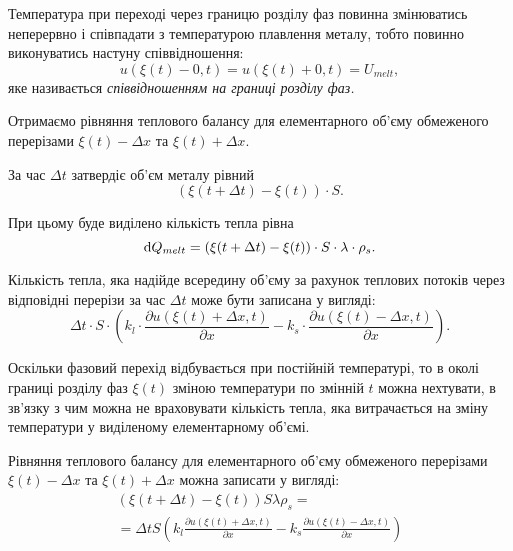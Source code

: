 \begin{definition}
	Температура при переході через границю розділу фаз повинна змінюватись неперервно і співпадати з температурою плавлення металу, тобто повинно виконуватись настуну співвідношення:
	\begin{equation}
		\label{eq:phase-border-conditions}
		u(\xi(t) - 0, t) = u(\xi(t) + 0, t) = U_{melt},
	\end{equation}
	яке називається \it{співвідношенням на границі розділу фаз}.
\end{definition}

Отримаємо рівняння теплового балансу для елементарного об'єму обмеженого перерізами $\xi(t) - \Delta x$ та $\xi(t) + \Delta x$. \medskip

За час $\Delta t$ затвердіє об'єм металу рівний
\begin{equation}
	(\xi(t + \Delta t) - \xi(t)) \cdot S.
\end{equation}

При цьому буде виділено кількість тепла рівна
\begin{equation}
	\mathop{}\!\mathrm{d} Q_{melt} = (\xi(t + \Delta t) - \xi(t)) \cdot S \cdot \lambda \cdot \rho_s.
\end{equation}

Кількість тепла, яка надійде всередину об'єму за рахунок теплових потоків через відповідні перерізи за час $\Delta t$ може бути записана у вигляді:
\begin{equation}
	\Delta t \cdot S \cdot \left( k_l \cdot \frac{\partial u(\xi(t) + \Delta x, t)}{\partial x} - k_s \cdot \frac{\partial u(\xi(t) - \Delta x, t)}{\partial x}\right).
\end{equation}
 
Оскільки фазовий перехід відбувається при постійній температурі, то в околі границі розділу фаз $\xi(t)$ зміною температури по змінній $t$ можна нехтувати, в зв'язку з чим можна не враховувати кількість тепла, яка витрачається на зміну температури у виділеному елементарному об'ємі. \medskip

Рівняння теплового балансу для елементарного об'єму обмеженого перерізами $\xi(t) - \Delta x$ та $\xi(t) + \Delta x$ можна записати у вигляді:
\begin{multline}
	(\xi(t + \Delta t) - \xi(t)) S \lambda \rho_s = \\
	= \Delta t S \left( k_l \frac{\partial u(\xi(t) + \Delta x, t)}{\partial x} - k_s \frac{\partial u(\xi(t) - \Delta x, t)}{\partial x}\right)
\end{multline}

